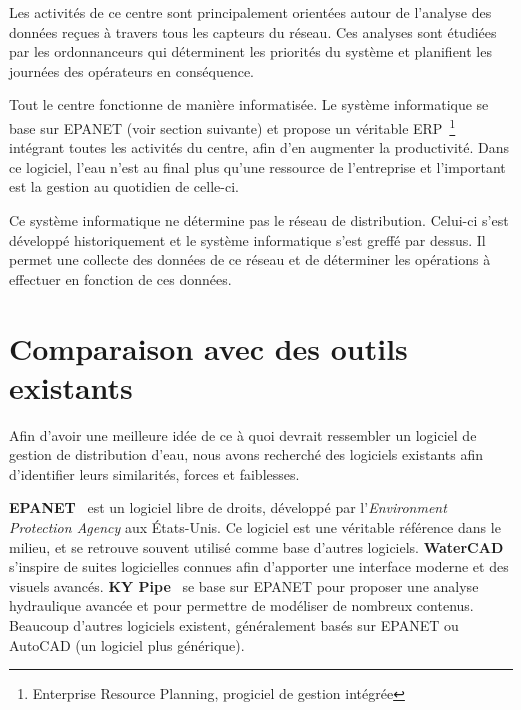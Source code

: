 \documentclass{EPL-master-thesis-covers-FR}
\begin{document}
				Les activités de ce centre sont principalement orientées autour de l'analyse des données reçues à travers tous les capteurs du réseau. Ces analyses sont étudiées par les ordonnanceurs qui déterminent les priorités du système et planifient les journées des opérateurs en conséquence.

				Tout le centre fonctionne de manière informatisée. Le système informatique se base sur EPANET (voir section suivante) et propose un véritable ERP~\footnote{Enterprise Resource Planning, progiciel de gestion intégrée} intégrant toutes les activités du centre, afin d'en augmenter la productivité. Dans ce logiciel, l'eau n'est au final plus qu'une ressource de l'entreprise et l'important est la gestion au quotidien de celle-ci.

				Ce système informatique ne détermine pas le réseau de distribution. Celui-ci s'est développé historiquement et le système informatique s'est greffé par dessus. Il permet une collecte des données de ce réseau et de déterminer les opérations à effectuer en fonction de ces données.

		\section{Comparaison avec des outils existants}

			Afin d'avoir une meilleure idée de ce à quoi devrait ressembler un logiciel de gestion de distribution d'eau, nous avons recherché des logiciels existants afin d'identifier leurs similarités, forces et faiblesses.

			\textbf{EPANET}~\cite{ref:epanet} est un logiciel libre de droits, développé par l'\emph{Environment Protection Agency} aux États-Unis. Ce logiciel est une véritable référence dans le milieu, et se retrouve souvent utilisé comme base d'autres logiciels. \textbf{WaterCAD}~\cite{ref:watercad} s'inspire de suites logicielles connues afin d'apporter une interface moderne et des visuels avancés. \textbf{KY Pipe}~\cite{ref:kypipe} se base sur EPANET pour proposer une analyse hydraulique avancée et pour permettre de modéliser de nombreux contenus. Beaucoup d'autres logiciels existent, généralement basés sur EPANET ou AutoCAD (un logiciel plus générique).
\end{document}
